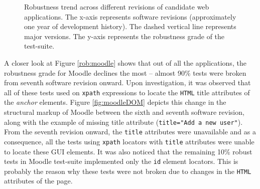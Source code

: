 \begin{figure}[!htbp]
\vspace{-2mm}
  \captionsetup{justification=justified,
singlelinecheck=false}
\caption{Robustness trend across different revisions of candidate web applications. The x-axis represents software revisions (approximately one year of development history). The dashed vertical line represents major versions. The y-axis represents the robustness grade of the test-suite.}
\label{fig:robustnessplots}
\end{figure} 

A closer look at Figure \ref{rob:moodle} shows that out of all the applications, the robustness grade for Moodle declines the most -- almost 90\% tests were broken from seventh software revision onward. Upon investigation, it was observed that all of these tests used on \texttt{xpath} expressions to locate the \texttt{HTML} title attributes of the \textit{anchor} elements. 
Figure \ref{fig:moodleDOM} depicts this change in the structural markup of Moodle between the sixth and seventh software revision, along with the example of missing title attribute (\texttt{title="Add a new user"}). From the seventh revision onward, the \texttt{title} attributes were unavailable and as a consequence, all the tests using \texttt{xpath} locators with \texttt{title} attributes were unable to locate these GUI elements. 
It was also noticed that the remaining 10\% robust tests in Moodle test-suite implemented only the \texttt{id} element locators. This is probably the reason why these tests were not broken due to changes in the \texttt{HTML} attributes of the page.


